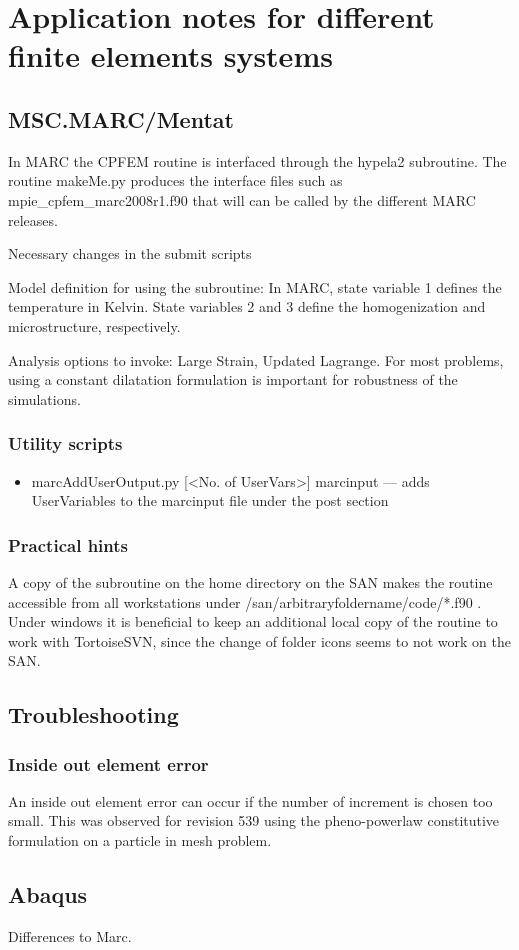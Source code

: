\chapter{Application notes for different finite elements systems}

\section{MSC.MARC/Mentat}
In MARC the CPFEM routine is interfaced through the {\ttfamily hypela2} subroutine. The routine {\ttfamily makeMe.py} produces the interface files such as {\ttfamily mpie\_cpfem\_marc2008r1.f90} that will can be called by the different MARC releases. 

Necessary changes in the submit scripts

Model definition for using the subroutine: In MARC, state variable 1 defines the temperature in Kelvin. State variables 2 and 3 define the homogenization and microstructure, respectively.

Analysis options to invoke: Large Strain, Updated Lagrange. For most problems, using a constant dilatation formulation is important for robustness of the simulations. 

\subsection{Utility scripts}
\begin{itemize}
\item marcAddUserOutput.py [<No. of UserVars>] marcinput --- adds UserVariables to the marcinput file under the post section
\end{itemize}

\subsection{Practical hints}
A copy of the subroutine on the home directory on the SAN makes the routine accessible from all workstations under /san/arbitraryfoldername/code/*.f90 .
Under windows it is beneficial to keep an additional local copy of the routine to work with TortoiseSVN, since the change of folder icons seems to not work on the SAN. 


\section{Troubleshooting}
\subsection{Inside out element error}
An inside out element error can occur if the number of increment is chosen too small. This was observed for revision 539 using the pheno-powerlaw constitutive formulation on a particle in mesh problem. 

\section{Abaqus}
Differences to Marc.


